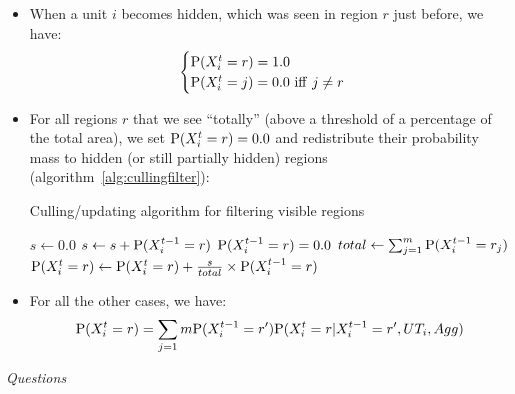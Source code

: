 \begin{itemize}
    \item When a unit $i$ becomes hidden, which was seen in region $r$ just before, we have:
\begin{eqnarray*}
\begin{cases}
\mathrm{P}(X^t_{i} = r) = 1.0\\
\mathrm{P}(X^t_{i} = j) = 0.0\ \mathrm{iff}\ j \neq r
\end{cases}
\end{eqnarray*}

    \item For all regions $r$ that we see ``totally'' (above a threshold of a percentage of the total area), we set $\mathrm{P}(X^t_i = r) = 0.0$ and redistribute their probability mass to hidden (or still partially hidden) regions (algorithm~\ref{alg:cullingfilter}):
\begin{algorithm}[!h]
\caption{Culling/updating algorithm for filtering visible regions}
\label{alg:cullingfilter}
\begin{algorithmic}
    \State $s \leftarrow 0.0$
        \State $s \leftarrow s + \mathrm{P}(X^{t-1}_i = r)$
        \State $\mathrm{P}(X^{t-1}_i = r) = 0.0$
    \EndFor
    \State $total \leftarrow \sum_{j=1}^m \mathrm{P}(X^{t-1}_i=r_j)$
        \State $\mathrm{P}(X^t_i = r) \leftarrow \mathrm{P}(X^t_i = r) + \frac{s}{total}\times \mathrm{P}(X^{t-1}_i = r)$
    \EndFor
\EndFor
\end{algorithmic}
\end{algorithm}

    \item For all the other cases, we have:
$$\mathrm{P}(X^t_{i} = r) = \sum_{j=1}{m} \mathrm{P}(X^{t-1}_i = r')\mathrm{P}(X^t_i = r | X^{t-1}_i = r', UT_i, Agg)$$
\end{itemize}

\vspace{0.3cm}
\textit{Questions}\\
\vspace{0.5cm}

